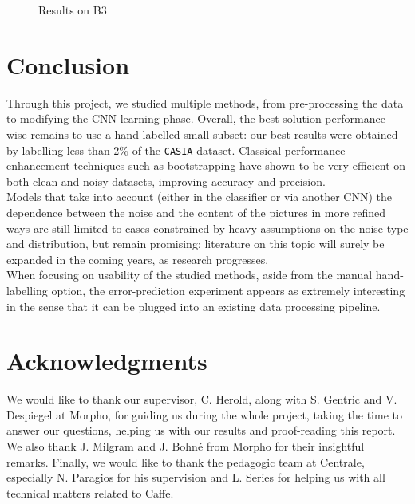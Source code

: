 \documentclass[a4paper]{article}
\begin{document}
\begin{figure}[H]
                \caption{Results on B3}
                \label{fig:BB3}
    \end{figure} 
    

\section{Conclusion}
    Through this project, we studied multiple methods, from pre-processing the data to modifying the CNN learning phase. Overall, the best solution performance-wise remains to use a hand-labelled small subset: our best results were obtained by labelling less than 2\% of the \texttt{CASIA} dataset. Classical performance enhancement techniques such as bootstrapping have shown to be very efficient on both clean and noisy datasets, improving accuracy and precision.\\
    Models that take into account (either in the classifier or via another CNN) the dependence between the noise and the content of the pictures in more refined ways are still limited to cases constrained by heavy assumptions on the noise type and distribution, but remain promising; literature on this topic will surely be expanded in the coming years, as research progresses.\\
    When focusing on usability of the studied methods, aside from the manual hand-labelling option, the error-prediction experiment appears as extremely interesting in the sense that it can be plugged into an existing data processing pipeline.


\section{Acknowledgments}
    We would like to thank our supervisor, C. Herold, along with S. Gentric and V. Despiegel at Morpho, for guiding us during the whole project, taking the time to answer our questions, helping us with our results and proof-reading this report. We also thank J. Milgram and J. Bohn\'e from Morpho for their insightful remarks. Finally, we would like to thank the pedagogic team at Centrale, especially N. Paragios for his supervision and L. Series for helping us with all technical matters related to Caffe. 
\end{document}
